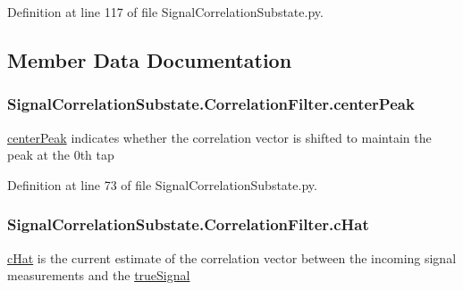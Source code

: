 Definition at line 117 of file Signal\+Correlation\+Substate.\+py.



\subsection{Member Data Documentation}
\subsubsection[{\texorpdfstring{center\+Peak}{centerPeak}}]{\setlength{\rightskip}{0pt plus 5cm}Signal\+Correlation\+Substate.\+Correlation\+Filter.\+center\+Peak}\hypertarget{classSignalCorrelationSubstate_1_1CorrelationFilter_a8e53182c2ff431a6a545a265cda6ba48}{}\label{classSignalCorrelationSubstate_1_1CorrelationFilter_a8e53182c2ff431a6a545a265cda6ba48}


\hyperlink{classSignalCorrelationSubstate_1_1CorrelationFilter_a8e53182c2ff431a6a545a265cda6ba48}{center\+Peak} indicates whether the correlation vector is shifted to maintain the peak at the 0th tap 



Definition at line 73 of file Signal\+Correlation\+Substate.\+py.

\subsubsection[{\texorpdfstring{c\+Hat}{cHat}}]{\setlength{\rightskip}{0pt plus 5cm}Signal\+Correlation\+Substate.\+Correlation\+Filter.\+c\+Hat}\hypertarget{classSignalCorrelationSubstate_1_1CorrelationFilter_ad07b1d484b9ab77a1a8fc215f10faf15}{}\label{classSignalCorrelationSubstate_1_1CorrelationFilter_ad07b1d484b9ab77a1a8fc215f10faf15}


\hyperlink{classSignalCorrelationSubstate_1_1CorrelationFilter_ad07b1d484b9ab77a1a8fc215f10faf15}{c\+Hat} is the current estimate of the correlation vector between the incoming signal measurements and the \hyperlink{classSignalCorrelationSubstate_1_1CorrelationFilter_a67ff75effd8a8a7e34f0f3e8c56ef491}{true\+Signal} 



